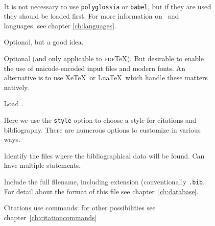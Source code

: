 \begin{figure}
\begin{minipage}[t]{0.7\linewidth}
  \vspace{2pc}
  \colorbox{blue!15}{}\\
  \vspace{1pc}
\end{minipage}%
\begin{minipage}[t]{0.7\linewidth}
  \sffamily\small
  \vspace{1pc}
   It is not necessary to use \texttt{polyglossia} or \texttt{babel},
  but if they are used they should be loaded first. For more
  information on \biblatex\ and languages, see chapter
  \ref{ch:languages}.
  \vspace{1pc}
  
   Optional,
  but a good idea.

  \vspace{1pc} 
  Optional (and only applicable to \textsc{pdf}\TeX). But
  desirable to enable the use of unicode-encoded input files and
  modern fonts. An alternative is to use Xe\TeX\ or Lua\TeX\, which
  handle these matters natively.

  \vspace{1pc}

   Load \biblatex.
  \vspace{1pc}
  
  Here we use the
  \texttt{style} option to choose a style for citations
  and
  bibliography. There are numerous options to customize in various ways.

  \vspace{1pc}
  \strut{}
  Identify the files where the bibliographical data will be found. Can
  have multiple  statements.
  
  \vspace{0.5pc}
   Include the
  full filename, including extension (conventionally
  \texttt{.bib}. For detail about the format of this file see chapter~\ref{ch:database}.

  \vspace{1.3pc}
   Citations use
   commands: for other possibilities see
  chapter~\ref{ch:citationcommands}


\end{minipage}
\end{figure}
